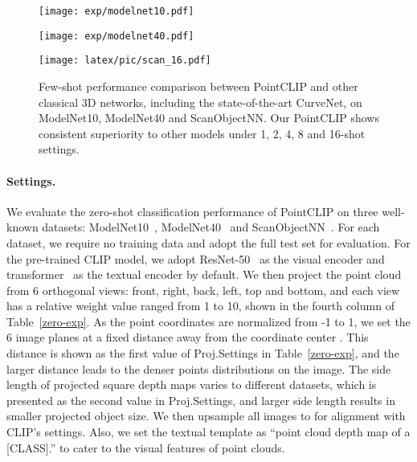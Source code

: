 \documentclass[10pt,twocolumn,letterpaper]{article}
\begin{document}
\begin{figure*}[ht]
    \centering
    
    \begin{minipage}[t]{0.33\linewidth}
    \centering
    \texttt{[image: exp/modelnet10.pdf]}
\end{minipage}
\begin{minipage}[t]{0.33\linewidth}
    \centering
    \texttt{[image: exp/modelnet40.pdf]}
\end{minipage}
    \begin{minipage}[t]{0.33\linewidth}
    \centering
    \texttt{[image: latex/pic/scan\_16.pdf]}
\end{minipage}

    \centering
    \caption{Few-shot performance comparison between PointCLIP and other classical 3D networks, including the state-of-the-art CurveNet, on ModelNet10, ModelNet40 and ScanObjectNN. Our PointCLIP shows consistent superiority to other models under 1, 2, 4, 8 and 16-shot settings.}
    \label{10 datasets}
    \vspace*{-12pt}
\end{figure*}

\paragraph{Settings.}
We evaluate the zero-shot classification performance of PointCLIP on three well-known datasets: ModelNet10~\cite{wu20153d}, ModelNet40~\cite{wu20153d} and ScanObjectNN~\cite{uy2019revisiting}. For each dataset, we require no training data and adopt the full test set for evaluation.
For the pre-trained CLIP model, we adopt ResNet-50~\cite{he2016deep} as the visual encoder and transformer~\cite{vaswani2017attention} as the textual encoder by default. We then project the point cloud from 6 orthogonal views: front, right, back, left, top and bottom, and each view has a relative weight value ranged from 1 to 10, shown in the fourth column of Table~\ref{zero-exp}. As the point coordinates are normalized from -1 to 1, we set the 6 image planes at a fixed distance away from the coordinate center . This distance is shown as the first value of Proj.Settings in Table~\ref{zero-exp}, and the larger distance leads to the denser points distributions on the image. The side length of projected square depth maps varies to different datasets, which is presented as the second value in Proj.Settings, and larger side length results in smaller projected object size. We then upsample all images to  for alignment with CLIP's settings. Also, we set the textual template as ``point cloud depth map of a [CLASS].'' to cater to the visual features of point clouds.
\end{document}
